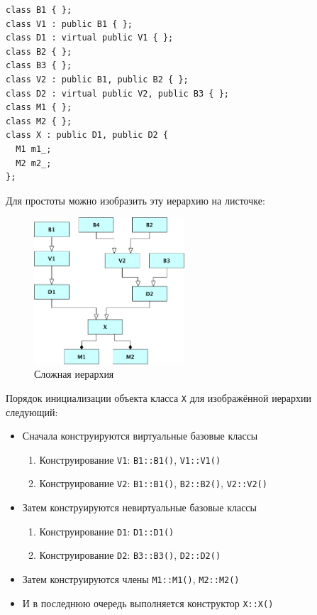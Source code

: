 \documentclass[a4paper,12pt,oneside]{book}
\begin{document}
\begin{lstlisting}
class B1 { };
class V1 : public B1 { };
class D1 : virtual public V1 { };
class B2 { };
class B3 { };
class V2 : public B1, public B2 { };
class D2 : virtual public V2, public B3 { };
class M1 { };
class M2 { };
class X : public D1, public D2 {
  M1 m1_;
  M2 m2_;
};
\end{lstlisting}

Для простоты можно изобразить эту иерархию на листочке:

\begin{figure}[h!]
\centering
\includegraphics[width=0.5\textwidth]{illustrations/complexhier-crop.pdf}
\caption{Сложная иерархия}
\label{fig:complexhier-crop}
\end{figure}

Порядок инициализации объекта класса \lstinline!X! для изображённой иерархии следующий:

\begin{itemize}
\item Сначала конструируются виртуальные базовые классы
  \begin{enumerate}
  \item Конструирование \lstinline!V1!: \lstinline!B1::B1()!, \lstinline!V1::V1()!
  \item Конструирование \lstinline!V2!: \lstinline!B1::B1()!, \lstinline!B2::B2()!, \lstinline!V2::V2()!
  \end{enumerate}
\item Затем конструируются невиртуальные базовые классы
  \begin{enumerate}
  \item Конструирование \lstinline!D1!: \lstinline!D1::D1()!
  \item Конструирование \lstinline!D2!: \lstinline!B3::B3()!, \lstinline!D2::D2()!
  \end{enumerate}
\item Затем конструируются члены \lstinline!M1::M1()!, \lstinline!M2::M2()!
\item И в последнюю очередь выполняется конструктор \lstinline!X::X()!
\end{itemize}
\end{document}
